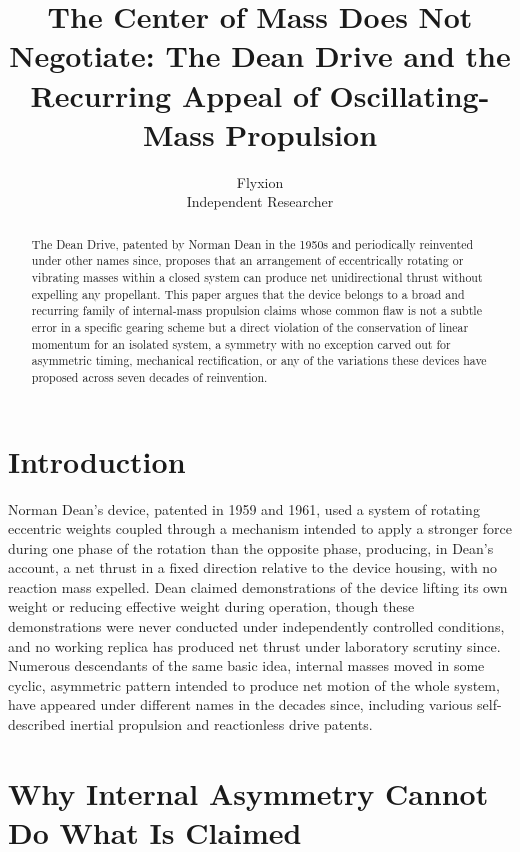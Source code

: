 \documentclass[11pt]{article}
\title{The Center of Mass Does Not Negotiate: The Dean Drive and the Recurring Appeal of Oscillating-Mass Propulsion}
\author{Flyxion \\ \small Independent Researcher}
\date{}
\begin{document}
\maketitle

\begin{abstract}
The Dean Drive, patented by Norman Dean in the 1950s and periodically reinvented under other names since, proposes that an arrangement of eccentrically rotating or vibrating masses within a closed system can produce net unidirectional thrust without expelling any propellant. This paper argues that the device belongs to a broad and recurring family of internal-mass propulsion claims whose common flaw is not a subtle error in a specific gearing scheme but a direct violation of the conservation of linear momentum for an isolated system, a symmetry with no exception carved out for asymmetric timing, mechanical rectification, or any of the variations these devices have proposed across seven decades of reinvention.
\end{abstract}

\section{Introduction}

Norman Dean's device, patented in 1959 and 1961, used a system of rotating eccentric weights coupled through a mechanism intended to apply a stronger force during one phase of the rotation than the opposite phase, producing, in Dean's account, a net thrust in a fixed direction relative to the device housing, with no reaction mass expelled. Dean claimed demonstrations of the device lifting its own weight or reducing effective weight during operation, though these demonstrations were never conducted under independently controlled conditions, and no working replica has produced net thrust under laboratory scrutiny since. Numerous descendants of the same basic idea, internal masses moved in some cyclic, asymmetric pattern intended to produce net motion of the whole system, have appeared under different names in the decades since, including various self-described inertial propulsion and reactionless drive patents.

\section{Why Internal Asymmetry Cannot Do What Is Claimed}
\end{document}
